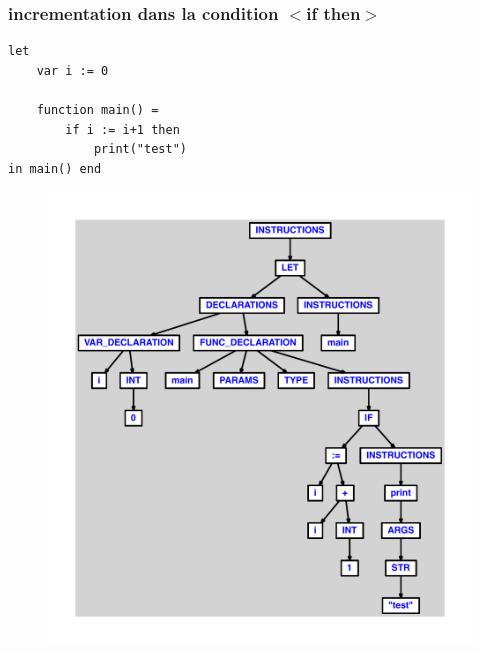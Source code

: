\documentclass{article}
\begin{document}
\subsubsection{incrementation dans la condition $ < $if then$ > $}
\begin{lstlisting}
let
	var i := 0

	function main() =
		if i := i+1 then
			print("test")
in main() end
\end{lstlisting}
\newpage
\begin{figure}[H]
\centering
\includegraphics[max width=\textwidth]{ast/ast_248.pdf}
\end{figure}
\newpage
\end{document}
